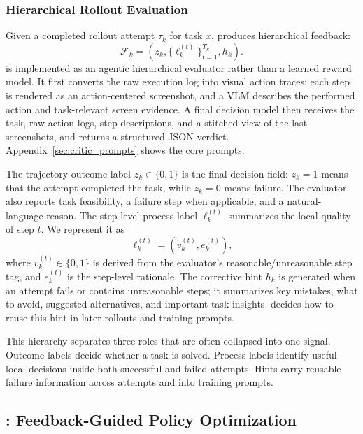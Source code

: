 \subsubsection{Hierarchical Rollout Evaluation}
\label{sec:evaluation}

Given a completed rollout attempt $\tau_k$ for task $x$, \critic produces hierarchical feedback:
\begin{equation}
\label{eq:feedback-object}
    \mathcal{F}_{k}
    =\left(z_{k},\{\ell_k^{(t)}\}_{t=1}^{T_k},h_k\right).
\end{equation}
\critic is implemented as an agentic hierarchical evaluator rather than a learned reward model. It first converts the raw execution log into visual action traces: each step is rendered as an action-centered screenshot, and a VLM describes the performed action and task-relevant screen evidence. A final decision model then receives the task, raw action logs, step descriptions, and a stitched view of the last screenshots, and returns a structured JSON verdict. Appendix~\ref{sec:critic_prompts} shows the core prompts.

The trajectory outcome label $z_k\in\{0,1\}$ is the final decision field: $z_k=1$ means that the attempt completed the task, while $z_k=0$ means failure. The evaluator also reports task feasibility, a failure step when applicable, and a natural-language reason. The step-level process label $\ell_k^{(t)}$ summarizes the local quality of step $t$. We represent it as
\begin{equation}
\label{eq:process-label}
    \ell_k^{(t)}=(v_k^{(t)},e_k^{(t)}),
\end{equation}
where $v_k^{(t)}\in\{0,1\}$ is derived from the evaluator's reasonable/unreasonable step tag, and $e_k^{(t)}$ is the step-level rationale. The corrective hint $h_k$ is generated when an attempt fails or contains unreasonable steps; it summarizes key mistakes, what to avoid, suggested alternatives, and important task insights. \hifpo decides how to reuse this hint in later rollouts and training prompts.

This hierarchy separates three roles that are often collapsed into one signal. Outcome labels decide whether a task is solved. Process labels identify useful local decisions inside both successful and failed attempts. Hints carry reusable failure information across attempts and into training prompts.



\subsection{\hifpo: Feedback-Guided Policy Optimization}
\label{sec:optimization}

